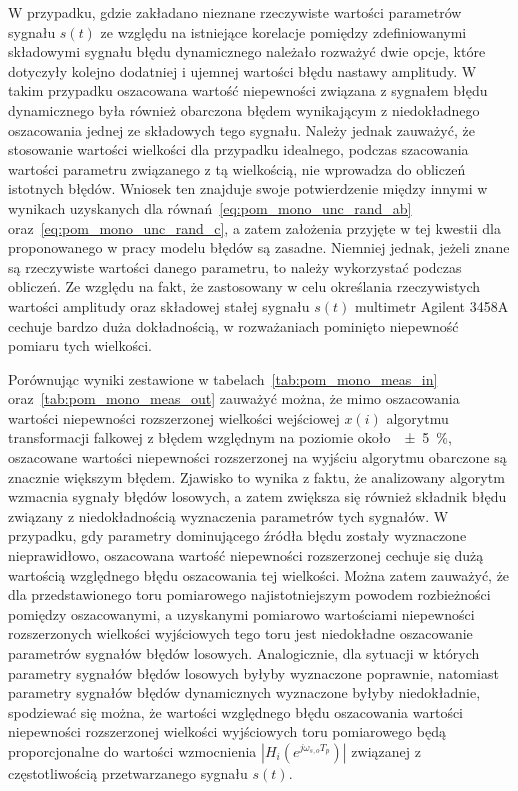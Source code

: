 W przypadku, gdzie zakładano nieznane rzeczywiste wartości parametrów sygnału $s(t)$ ze względu na istniejące korelacje pomiędzy zdefiniowanymi składowymi sygnału błędu dynamicznego należało rozważyć dwie opcje, które dotyczyły kolejno dodatniej i ujemnej wartości błędu nastawy amplitudy. W takim przypadku oszacowana wartość niepewności związana z sygnałem błędu dynamicznego była również obarczona błędem wynikającym z niedokładnego oszacowania jednej ze składowych tego sygnału. Należy jednak zauważyć, że stosowanie wartości wielkości dla przypadku idealnego, podczas szacowania wartości parametru związanego z tą wielkością, nie wprowadza do obliczeń istotnych błędów. Wniosek ten znajduje swoje potwierdzenie między innymi w wynikach uzyskanych dla równań~\eqref{eq:pom_mono_unc_rand_ab} oraz~\eqref{eq:pom_mono_unc_rand_c}, a zatem założenia przyjęte w tej kwestii dla proponowanego w pracy modelu błędów są zasadne. Niemniej jednak, jeżeli znane są rzeczywiste wartości danego parametru, to należy wykorzystać podczas obliczeń. Ze względu na fakt, że zastosowany w celu określania rzeczywistych wartości amplitudy oraz składowej stałej sygnału $s(t)$ multimetr Agilent 3458A cechuje bardzo duża dokładnością, w rozważaniach pominięto niepewność pomiaru tych wielkości.

Porównując wyniki zestawione w tabelach~\ref{tab:pom_mono_meas_in} oraz~\ref{tab:pom_mono_meas_out} zauważyć można, że mimo oszacowania wartości niepewności rozszerzonej wielkości wejściowej $x(i)$ algorytmu transformacji falkowej z błędem względnym na poziomie około~\qty{\pm 5}{\percent}, oszacowane wartości niepewności rozszerzonej na wyjściu algorytmu obarczone są znacznie większym błędem. Zjawisko to wynika z faktu, że analizowany algorytm wzmacnia sygnały błędów losowych, a zatem zwiększa się również składnik błędu związany z niedokładnością wyznaczenia parametrów tych sygnałów. W przypadku, gdy parametry dominującego źródła błędu zostały wyznaczone nieprawidłowo, oszacowana wartość niepewności rozszerzonej cechuje się dużą wartością względnego błędu oszacowania tej wielkości. Można zatem zauważyć, że dla przedstawionego toru pomiarowego najistotniejszym powodem rozbieżności pomiędzy oszacowanymi, a uzyskanymi pomiarowo wartościami niepewności rozszerzonych wielkości wyjściowych tego toru jest niedokładne oszacowanie parametrów sygnałów błędów losowych. Analogicznie, dla sytuacji w których parametry sygnałów błędów losowych byłyby wyznaczone poprawnie, natomiast parametry sygnałów błędów dynamicznych wyznaczone byłyby niedokładnie, spodziewać się można, że wartości względnego błędu oszacowania wartości niepewności rozszerzonej wielkości wyjściowych toru pomiarowego będą proporcjonalne do wartości wzmocnienia $|H_{i}(e^{j \omega_{s,o} T_{p}})|$ związanej z częstotliwością przetwarzanego sygnału $s(t)$.

